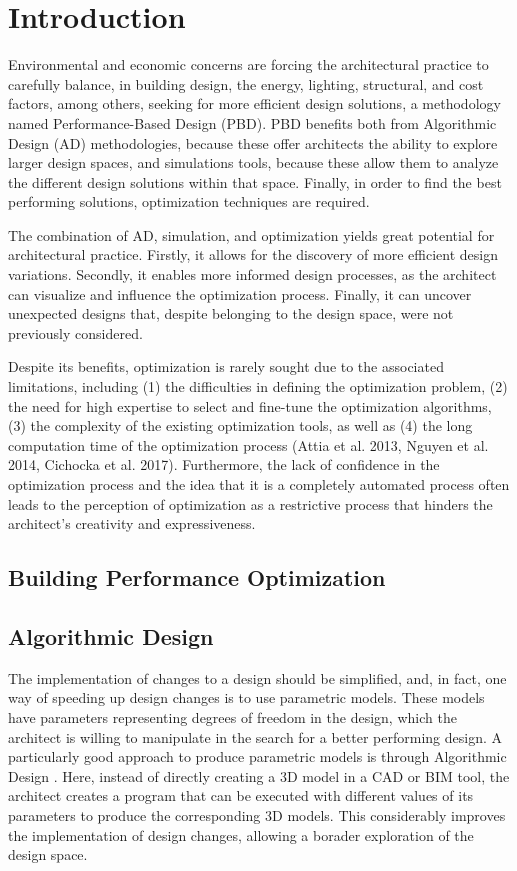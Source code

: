 \section{Introduction}
\label{sec:intro}

	Environmental and economic concerns are forcing the architectural practice to carefully balance, in building design, the energy, lighting, structural, and cost factors, among others, seeking for more efficient design solutions, a methodology named Performance-Based Design (PBD). PBD benefits both from Algorithmic Design (AD) methodologies, because these offer architects the ability to explore larger design spaces, and simulations tools, because these allow them to analyze the different design solutions within that space. Finally, in order to find the best performing solutions, optimization techniques are required. 

	The combination of AD, simulation, and optimization yields great potential for architectural practice. Firstly, it allows for the discovery of more efficient design variations. Secondly, it enables more informed design processes, as the architect can visualize and influence the optimization process. Finally, it can uncover unexpected designs that, despite belonging to the design space, were not previously considered.

	Despite its benefits, optimization is rarely sought due to the associated limitations, including (1) the difficulties in defining the optimization problem, (2) the need for high expertise to select and fine-tune the optimization algorithms, (3) the complexity of the existing optimization tools, as well as (4) the long computation time of the optimization process (Attia et al. 2013, Nguyen et al. 2014, Cichocka et al. 2017). Furthermore, the lack of confidence in the optimization process and the idea that it is a completely automated process often leads to the perception of optimization as a restrictive process that hinders the architect’s creativity and expressiveness.

\subsection{Building Performance Optimization}
	
	
\subsection{Algorithmic Design}

	The implementation of changes to a design should be simplified, and, in fact, one way of speeding up design changes is to use parametric models. These models have parameters representing degrees of freedom in the design, which the architect is willing to manipulate in the search for a better performing design. A particularly good approach to produce parametric models is through Algorithmic Design \cite{Terzidis2006}. Here, instead of directly creating a 3D model in a \ac{CAD} or \ac{BIM} tool, the architect creates a program that can be executed with different values of its parameters to produce the corresponding 3D models. This considerably improves the implementation of design changes, allowing a borader exploration of the design space.

